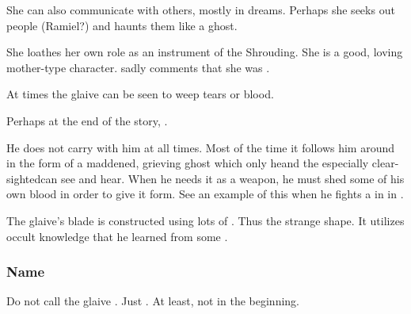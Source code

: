 She can also communicate with others, mostly in dreams. 
Perhaps she seeks out people (Ramiel?) and haunts them like a ghost. 

She loathes her own role as an instrument of the Shrouding. 
She is a good, loving mother-type character. 
\Ishnaruchaefir{} sadly comments that she was .

At times the glaive can be seen to weep tears or blood.

Perhaps at the end of the story, . 

He does not carry \Triestessakhin{} with him at all times. 
Most of the time it follows him around in the form of a maddened, grieving ghost which only he\dash and the especially clear-sighted\dash can see and hear. 
When he needs it as a weapon, he must shed some of his own blood in order to give it form. 
See an example of this {when he fights a \ghobal{} in \Malcur} in \TwilightAngelRememberEmph.

The glaive's blade is constructed using lots of . 
Thus the strange shape. 
It utilizes occult knowledge that he learned from some . 





\subsubsection{Name}
Do not call the glaive \quo{\Rystessakhin}. 
Just .
At least, not in the beginning. 





